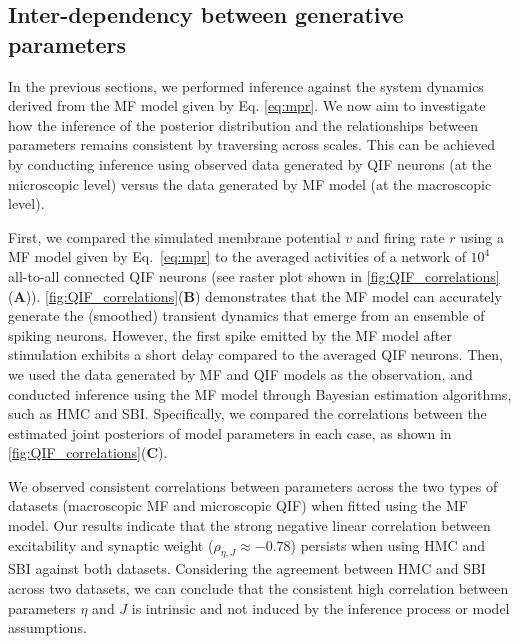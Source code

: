 \documentclass[preprint,11pt,authoryear]{elsarticle}
\begin{document}
\subsection{Inter-dependency between generative parameters}

In the previous sections, we performed inference against the system dynamics derived from the MF model given by Eq. \eqref{eq:mpr}. We now aim to investigate how the inference of the posterior distribution and the relationships between parameters remains consistent by traversing across scales. This can be achieved by conducting inference using observed data generated by QIF neurons (at the microscopic level) versus the data generated by MF model (at the macroscopic level).

First, we compared the simulated membrane potential $v$ and firing rate $r$ using a MF model given by Eq.~\eqref{eq:mpr} to the averaged activities of a network of $10^4$ all-to-all connected QIF neurons (see raster plot shown in \autoref{fig:QIF_correlations}(\textbf{A})). \autoref{fig:QIF_correlations}(\textbf{B}) demonstrates that the MF model can accurately generate the (smoothed) transient dynamics that emerge from an ensemble of spiking neurons. However, the first spike emitted by the MF model after stimulation exhibits a short delay compared to the averaged QIF neurons. %
Then, we used the data generated by MF and QIF models as the observation, and conducted inference using the MF model through Bayesian estimation algorithms, such as HMC and SBI. Specifically, we compared the correlations between the estimated joint posteriors of model parameters in each case, as shown in \autoref{fig:QIF_correlations}(\textbf{C}). 

We observed consistent correlations between parameters across the two types of datasets (macroscopic MF and microscopic QIF) when fitted using the MF model. Our results indicate that the strong negative linear correlation between excitability and synaptic weight ($\rho_{\eta, J} \approx -0.78$) persists when using HMC and SBI against both datasets. Considering the agreement between HMC and SBI across two datasets, we can conclude that the consistent high correlation between parameters $\eta$ and $J$ is intrinsic and not induced by the inference process or model assumptions.
\end{document}
